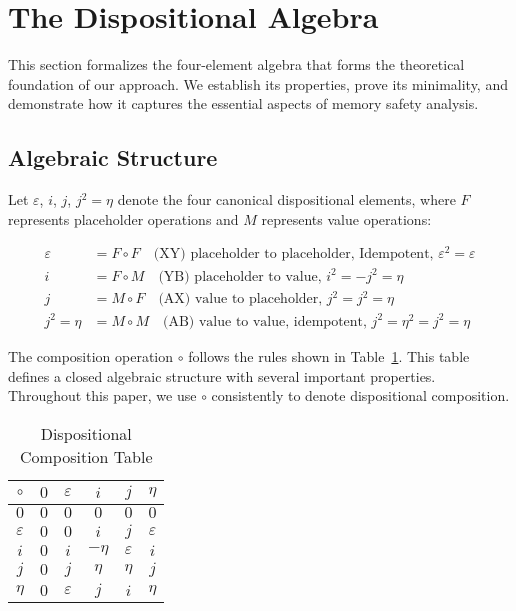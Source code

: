 \documentclass[acmsmall,anonymous,review,screen]{acmart}
\begin{document}
	\section{The Dispositional Algebra}
	\label{sec:algebra}
	
	This section formalizes the four-element algebra that forms the theoretical foundation of our approach. We establish its properties, prove its minimality, and demonstrate how it captures the essential aspects of memory safety analysis.
	
	\subsection{Algebraic Structure}
	
	Let $\varepsilon$, $i$, $j$, $j^{2} = \eta$ denote the four canonical dispositional elements, where $F$ represents placeholder operations and $M$ represents value operations:
	
	\begin{align}
		\varepsilon &= F \circ F \quad \text{(XY) placeholder to placeholder, Idempotent, } \varepsilon^2 = \varepsilon \\
		i &= F \circ M \quad \text{(YB) placeholder to value, } i^2 = -j^{2} = \eta \\
		j &= M \circ F \quad \text{(AX) value to placeholder, } j^2 = j^{2} = \eta \\
		j^{2} = \eta &= M \circ M \quad \text{(AB) value to value, idempotent, } j^{2} = \eta^2 = j^{2} = \eta
	\end{align}
	
	The composition operation $\circ$ follows the rules shown in Table~\ref{tab:composition}. This table defines a closed algebraic structure with several important properties. Throughout this paper, we use $\circ$ consistently to denote dispositional composition.
	
	\begin{table}[t]
    \centering
    \caption{Dispositional Composition Table}
    \label{tab:composition}
    \begin{tabular}{c|ccccc}
        \toprule
        $\circ$ & $0$ & $\varepsilon$ & $i$ & $j$ & $\eta$ \\
        \midrule
        $0$ & $0$ & $0$ & $0$ & $0$ & $0$ \\
        $\varepsilon$ & $0$ & $0$ & $i$ & $j$ & $\varepsilon$ \\
        $i$ & $0$ & $i$ & $-\eta$ & $\varepsilon$ & $i$ \\
        $j$ & $0$ & $j$ & $\eta$ & $\eta$ & $j$ \\
        $\eta$ & $0$ & $\varepsilon$ & $j$ & $i$ & $\eta$ \\
        \bottomrule
    \end{tabular}
\end{table}
	
\end{document}
